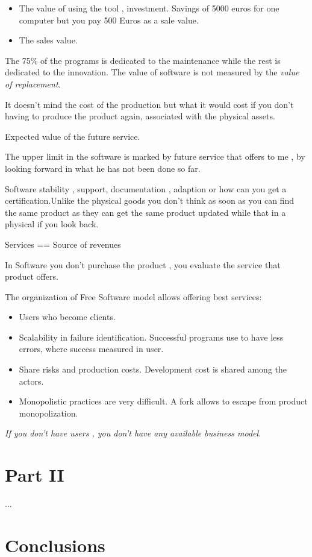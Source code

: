 \begin{itemize}
    \item The value of using the tool , investment.
    Savings of 5000 euros  for one computer but you pay 500 Euros as a sale
    value.
    \item The sales value.
\end{itemize}


The 75\% of the programs is dedicated to the maintenance while the rest is
dedicated to the innovation.
The value of software is not measured by the \emph{value of replacement}. 

It doesn't mind the cost of the production but what it would cost if you don't
having to produce the product again, associated with the physical assets.


Expected value of the future service.

The upper limit in the software is marked by future service that offers to me ,
by looking forward in what he has not been done so far.

Software stability , support, documentation , adaption or how can you get a
certification.Unlike the physical goods you don't think as soon as you can find
the same product as they can get the same product updated while that in a
physical if you look back.

    Services == Source of revenues

In Software you don't purchase the product , you evaluate the service that product offers.

The organization of Free Software model allows offering best services:
\begin{itemize}
    \item Users who become clients.
    \item Scalability in failure identification. Successful programs use to have less errors, where success measured in user.
    \item Share risks and production costs. Development cost is shared among the actors.
    \item Monopolistic practices are very difficult. A fork allows to escape from product monopolization.
\end{itemize}

\emph{If you don't have users , you don't have any available business model.}

\section{Part II}\label{Part II} %

...

\section{Conclusions}\label{conclusions}
